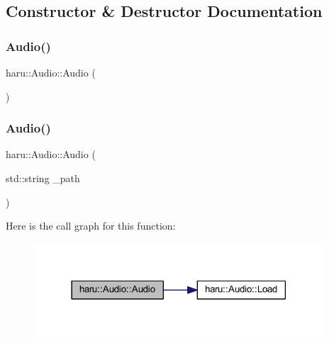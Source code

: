 \subsection{Constructor \& Destructor Documentation}
\mbox{\label{classharu_1_1_audio_aea8dbe76a9546e5caf2697d87e75d7db}} 
\subsubsection{\texorpdfstring{Audio()}{Audio()}\hspace{0.1cm}{\footnotesize\ttfamily [1/2]}}
{\footnotesize\ttfamily haru\+::\+Audio\+::\+Audio (\begin{DoxyParamCaption}{ }\end{DoxyParamCaption})}

\mbox{\label{classharu_1_1_audio_ab1f431d428ad8f32a1fc3b0762ebb234}} 
\subsubsection{\texorpdfstring{Audio()}{Audio()}\hspace{0.1cm}{\footnotesize\ttfamily [2/2]}}
{\footnotesize\ttfamily haru\+::\+Audio\+::\+Audio (\begin{DoxyParamCaption}\item[{std\+::string}]{\+\_\+path }\end{DoxyParamCaption})}

Here is the call graph for this function\+:
\nopagebreak
\begin{figure}[H]
\begin{center}
\leavevmode
\includegraphics[width=306pt]{classharu_1_1_audio_ab1f431d428ad8f32a1fc3b0762ebb234_cgraph}
\end{center}
\end{figure}


